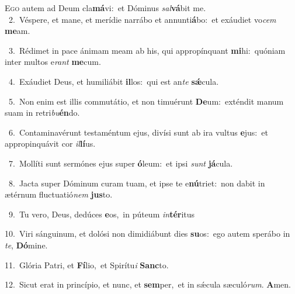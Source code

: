 \lettrine{\initial\textcolor{\initialcolor}{E}}{go} autem ad Deum cla\-\textbf{má}\-vi:~\star et Dóminus \textit{sal}\-\textbf{vá}bit me.\\
{\numbfont\textcolor{\numbcolor}{~2.}}~Véspere, et mane, et merídie narrábo et annunti\-\textbf{á}\-bo:~\star et exáudiet vo\textit{cem} \textbf{me}\-am.\par
{\numbfont\textcolor{\numbcolor}{~3.}}~Rédimet in pace ánimam meam ab his, qui appropínquant \textbf{mi}\-hi:~\star quóniam inter multos e\textit{rant} \textbf{me}\-cum.\par
{\numbfont\textcolor{\numbcolor}{~4.}}~Exáudiet Deus, et humiliábit \textbf{il}\-los:~\star qui est an\textit{te} \textbf{sǽ}\-cula.\par
{\numbfont\textcolor{\numbcolor}{~5.}}~Non enim est illis commutátio, et non timuérunt \textbf{De}\-um:~\star exténdit manum suam in retri\-\textit{bu}\-\textbf{én}do.\par
{\numbfont\textcolor{\numbcolor}{~6.}}~Contaminavérunt testaméntum ejus, divísi sunt ab ira vultus \textbf{e}\-jus:~\star et appropinquávit cor \textit{il}\-\textbf{lí}us.\par
{\numbfont\textcolor{\numbcolor}{~7.}}~Mollíti sunt sermónes ejus super \textbf{ó}\-leum:~\star et ipsi \textit{sunt} \textbf{já}\-cula.\par
{\numbfont\textcolor{\numbcolor}{~8.}}~Jacta super Dóminum curam tuam, et ipse te e\-\textbf{nú}\-triet:~\star non dabit in ætérnum fluctuatió\textit{nem} \textbf{jus}\-to.\par
{\numbfont\textcolor{\numbcolor}{~9.}}~Tu vero, Deus, dedúces \textbf{e}\-os,~\star in púteum \textit{in}\-\textbf{tér}itus\par
{\numbfont\textcolor{\numbcolor}{10.}}~Viri sánguinum, et dolósi non dimidiábunt dies \textbf{su}\-os:~\star ego autem sperábo in \textit{te}\-, \textbf{Dó}\-mine.\par
{\numbfont\textcolor{\numbcolor}{11.}}~Glória Patri, et \textbf{Fí}\-lio,~\star et Spirítu\textit{i} \textbf{Sanc}\-to.\par
{\numbfont\textcolor{\numbcolor}{12.}}~Sicut erat in princípio, et nunc, et \textbf{sem}\-per,~\star et in sǽcula sæculó\-\textit{rum}\-. \textbf{A}\-men.\par
